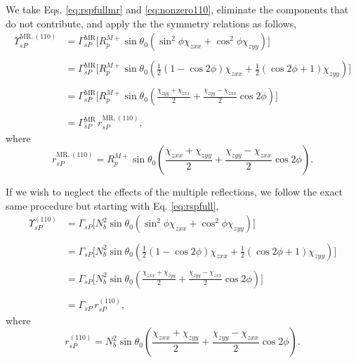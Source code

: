 We take Eqs. \eqref{eq:rspfullmr} and \eqref{eq:nonzero110}, eliminate the
components that do not contribute, and apply the the symmetry relations as
follows,
\begin{equation*}
\begin{split}
\Upsilon^{\mathrm{MR},(110)}_{sP} &=
\Gamma^{\mathrm{MR}}_{sP}
\big[
R^{M+}_{p}\sin\theta_{0}(\sin^{2}\phi\chi_{zxx} + \cos^{2}\phi\chi_{zyy})
\big]\\\\
&=
\Gamma^{\mathrm{MR}}_{sP}
\bigg[
R^{M+}_{p}\sin\theta_{0}
\left(
\frac{1}{2}(1-\cos2\phi)\chi_{zxx} + \frac{1}{2}(\cos2\phi+1)\chi_{zyy}
\right)
\bigg]\\\\
&=
\Gamma^{\mathrm{MR}}_{sP}
\bigg[
R^{M+}_{p}\sin\theta_{0}
\left(
\frac{\chi_{zyy} + \chi_{zxx}}{2} + \frac{\chi_{zyy} - \chi_{zxx}}{2}\cos2\phi
\right)
\bigg]\\\\
& = \Gamma^{\mathrm{MR}}_{sP}\,r^{\mathrm{MR},(110)}_{sP},
\end{split}
\end{equation*}
where
\begin{equation}\label{eq:final-rsp.mr.110}
r^{\mathrm{MR},(110)}_{sP} = 
R^{M+}_{p}\sin\theta_{0}
\left(
\frac{\chi_{zxx} + \chi_{zyy}}{2} + \frac{\chi_{zyy} - \chi_{zxx}}{2}\cos2\phi
\right).
\end{equation}

If we wish to neglect the effects of the multiple reflections, we follow the
exact same procedure but starting with Eq. \eqref{eq:rspfull},
\begin{equation*}
\begin{split}
\Upsilon^{(110)}_{sP} &=
\Gamma_{sP}
\big[
N^{2}_{b}\sin\theta_{0}(\sin^{2}\phi\chi_{zxx} + \cos^{2}\phi\chi_{zyy})
\big]\\\\
&=
\Gamma_{sP}
\bigg[
N^{2}_{b}\sin\theta_{0}
\left(
\frac{1}{2}(1-\cos2\phi)\chi_{zxx} + \frac{1}{2}(\cos2\phi+1)\chi_{zyy}
\right)
\bigg]\\\\
&=
\Gamma_{sP}
\bigg[
N^{2}_{b}\sin\theta_{0}
\left(
\frac{\chi_{zxx} + \chi_{zyy}}{2} + \frac{\chi_{zyy} - \chi_{zxx}}{2}\cos2\phi
\right)
\bigg]\\\\
&= \Gamma_{sP}\,r^{(110)}_{sP},
\end{split}
\end{equation*}
where
\begin{equation}\label{eq:final-rsp.110}
r^{(110)}_{sP} = 
N^{2}_{b}\sin\theta_{0}
\left(
\frac{\chi_{zxx} + \chi_{zyy}}{2} + \frac{\chi_{zyy} - \chi_{zxx}}{2}\cos2\phi
\right).
\end{equation}


